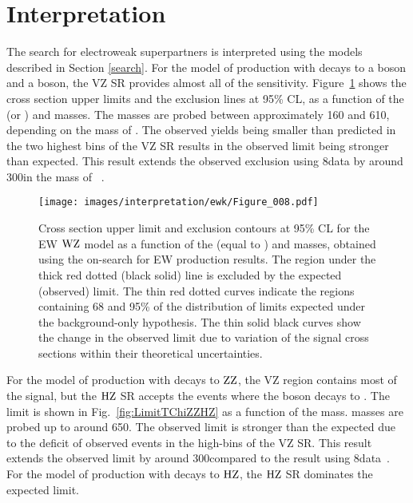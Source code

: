 \section{Interpretation}
\noindent
\justify
The search for electroweak superpartners is interpreted using the models described in Section \ref{search}.
For the model of \firstcharg\secondchi production with decays to a \PZ boson and a \PW boson, the VZ SR provides almost all of the sensitivity.
Figure~\ref{fig:LimitTChiWZ} shows the cross section upper limits and the exclusion lines at 95\% CL, as a function of the \firstcharg (or \secondchi) and \firstchi masses.
The \firstcharg masses are probed between approximately 160 and 610\GeV, depending on the mass of \firstchi.
The observed yields being smaller than predicted in the two highest \ptmiss bins of the VZ SR results in the observed limit being stronger than expected.
This result extends the observed exclusion using 8\TeV data by around 300\GeV in the mass of \firstcharg~\cite{2012ewk}.
\begin{figure}[hb]
 \centering
   \texttt{[image: images/interpretation/ewk/Figure\_008.pdf]}
   \caption{\label{fig:LimitTChiWZ}
     Cross section upper limit and exclusion contours at 95\% CL for the EW $\mathrm{W}\mathrm{Z}$ model
     as a function of the \firstcharg (equal to \secondchi) and \firstchi masses,
     obtained using the on-\PZ search for EW production results.
     The region under the thick red dotted (black solid) line is excluded by the expected (observed) limit.
     The thin red dotted curves indicate the regions containing 68 and 95\% of the distribution of limits
     expected under the background-only hypothesis.
     The thin solid black curves show the change in the observed limit due to
     variation of the signal cross sections within their theoretical uncertainties.
   }
\end{figure}
For the model of \firstchi\firstchi production with decays to $\mathrm{Z}\mathrm{Z}$, the VZ region contains most of the signal, but the $\mathrm{H}\mathrm{Z}$ SR accepts the events where the \PZ boson decays to \bbbar.
The limit is shown in Fig.~\ref{fig:LimitTChiZZHZ} as a function of the \firstchi mass.  
\firstchi masses are probed up to around 650\GeV.
The observed limit is stronger than the expected due to the deficit of observed events in the high-\ptmiss bins of the VZ SR.
This result extends the observed limit by around 300\GeV compared to the result using 8\TeV data~\cite{2012ewkhiggs}.
For the model of \firstchi\firstchi production with decays to $\mathrm{H}\mathrm{Z}$, the $\mathrm{H}\mathrm{Z}$ SR dominates the expected limit.
